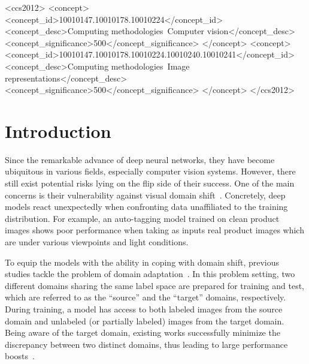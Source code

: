 \documentclass[sigconf]{acmart}
\begin{document}
\begin{CCSXML}
<ccs2012>
<concept>
<concept_id>10010147.10010178.10010224</concept_id>
<concept_desc>Computing methodologies~Computer vision</concept_desc>
<concept_significance>500</concept_significance>
</concept>
<concept>
<concept_id>10010147.10010178.10010224.10010240.10010241</concept_id>
<concept_desc>Computing methodologies~Image representations</concept_desc>
<concept_significance>500</concept_significance>
</concept>
</ccs2012>
\end{CCSXML}







\maketitle

\section{Introduction}
Since the remarkable advance of deep neural networks, they have become ubiquitous in various fields, especially computer vision systems. However, there still exist potential risks lying on the flip side of their success. One of the main concerns is their vulnerability against visual domain shift~\cite{ben2007analysis, ben2010theory, saenko2010adapting}. Concretely, deep models react unexpectedly when confronting data unaffiliated to the training distribution. For example, an auto-tagging model trained on clean product images shows poor performance when taking as inputs real product images which are under various viewpoints and light conditions.

To equip the models with the ability in coping with domain shift, previous studies tackle the problem of domain adaptation~\cite{daume2009frustratingly, sun2016return, tzeng2017adversarial, saito2018maximum, yue2019domain, kim2020learning}.
In this problem setting, two different domains sharing the same label space are prepared for training and test, which are referred to as the ``source'' and the ``target'' domains, respectively.
During training, a model has access to both labeled images from the source domain and unlabeled (or partially labeled) images from the target domain.
Being aware of the target domain, existing works successfully minimize the discrepancy between two distinct domains, thus leading to large performance boosts~\cite{ben2010theory, tzeng2017adversarial, sun2016return, tzeng2017adversarial, hoffman2018cycada, saito2018maximum, yue2019domain, kim2020learning, Xu2018DeepCN}.
\end{document}
